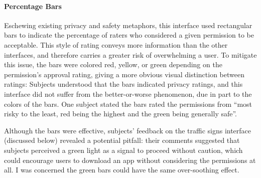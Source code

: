 \documentclass[11pt]{article}
\begin{document}
\paragraph{Percentage Bars}
\label{s-sec-pbars}

Eschewing existing privacy and safety metaphors,
this interface used rectangular bars to indicate 
the percentage of raters who considered a given permission to be acceptable.
This style of rating conveys more information than the other
interfaces, and therefore carries a greater risk of overwhelming a user. To mitigate this 
issue, the bars were colored red, yellow, or green depending on the permission's approval 
rating, giving a more obvious visual distinction between ratings:
\label{ss-sec-pbars-r1}
Subjects understood that the bars indicated privacy ratings, 
and this interface did not suffer from the better-or-worse
phenomenon, due in part to the colors of the bars. 
One subject stated the bars rated the permissions from ``most risky to the least, 
red being the highest and the green being generally safe''.

Although the bars were effective, subjects' feedback on 
the traffic signs interface (discussed below) 
revealed a potential pitfall: their comments suggested that subjects 
perceived a green light as a signal to proceed without caution, which could 
encourage users to download an app without considering the permissions at all. I 
was concerned the green bars 
could have the same over-soothing effect.
\end{document}
